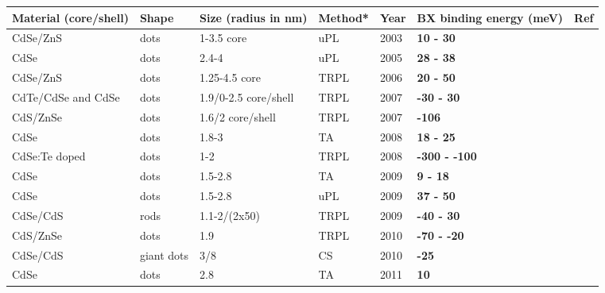 \documentclass[journal=nalefd, manuscript=letter, layout=twocolumn]{achemso}
\begin{document}
\begin{table*}[h]
\centering
    \begin{tabular}{M{3.4cm} M{2cm} M{3cm} M{2cm} M{1cm} M{2.25cm} M{0.75cm}}
    \toprule
         Material (core/shell) &Shape &Size (radius in nm) &Method*  &Year  &BX binding energy (meV)  &Ref  \\
         \midrule       
         CdSe/ZnS &dots &1-3.5 core &uPL &2003 &\textbf{10 - 30} & \\
         
         CdSe &dots &2.4-4 &uPL &2005 &\textbf{28 - 38} & \\
         
         CdSe/ZnS &dots &1.25-4.5 core &TRPL &2006 &\textbf{20 - 50} & \\
         
         CdTe/CdSe and CdSe &dots &1.9/0-2.5 core/shell &TRPL &2007 &\textbf{-30 - 30} & \\
         
         CdS/ZnSe &dots &1.6/2 core/shell &TRPL &2007 &\textbf{-106} & \\
                 
         CdSe &dots &1.8-3 &TA &2008 &\textbf{18 - 25} & \\
         
         CdSe:Te doped &dots &1-2 &TRPL &2008 &\textbf{-300 - -100} & \\
                  
         CdSe &dots &1.5-2.8 &TA &2009 &\textbf{9 - 18} & \\
                  
         CdSe &dots &1.5-2.8 &uPL &2009 &\textbf{37 - 50} & \\
                  
         CdSe/CdS &rods &1.1-2/(2x50) &TRPL &2009 &\textbf{-40 - 30} & \\
         
         CdS/ZnSe &dots &1.9 &TRPL &2010 &\textbf{-70 - -20} & \\
                  
         CdSe/CdS &giant dots &3/8 &CS &2010 &\textbf{-25} & \\
                  
         CdSe &dots &2.8 &TA &2011 &\textbf{10} & \\
         

\end{tabular}
\end{table*}
\end{document}
